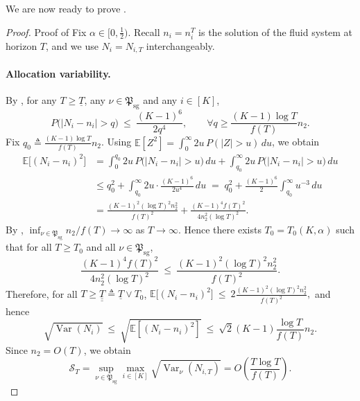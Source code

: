 \documentclass[nonblindrev]{informs3_noinforms}
\newcommand{\var}{\operatorname{Var}}
\newcommand{\E}{{\mathbb{E}}}
\begin{document}
We are now ready to prove .


\begin{proof}{Proof of }
Fix $\alpha\in[0,\tfrac12)$. Recall $n_i = n_i^T$ is the solution of the fluid system at horizon $T$, and we use $N_i = N_{i,T}$ interchangeably.
\paragraph{Allocation variability.}
By , for any $T\ge \underline T$, any $\nu \in \mathfrak{P}_{\text{sg}}$ and any $i\in[K]$,
\[
P\big(|N_i-n_i|>q\big)\ \le\ \frac{(K-1)^6}{2q^4},
\qquad \forall q\ge \frac{(K-1)\log T}{f(T)}n_2.
\]
Fix $q_0\triangleq \frac{(K-1)\log T}{f(T)}n_2$. Using
$\E[Z^2]=\int_0^\infty 2u\,P(|Z|>u)\,du$, we obtain
\begin{align*}
\E\big[(N_i-n_i)^2\big]
&= \int_0^{q_0} 2u\,P\big(|N_i-n_i|>u\big)\,du
   +\int_{q_0}^{\infty} 2u\,P\big(|N_i-n_i|>u\big)\,du \\
&\le q_0^2 + \int_{q_0}^{\infty} 2u\cdot \frac{(K-1)^6}{2u^4}\,du
 \;=\; q_0^2 + \frac{(K-1)^6}{2}\int_{q_0}^{\infty} u^{-3}\,du \\
&= \frac{(K-1)^2 (\log T)^2 n_2^2}{f(T)^2}+\frac{(K-1)^4 f(T)^2}{4n_2^2(\log T)^2}.
\end{align*}
By , $\inf_{\nu\in\mathfrak{P}_{\text{sg}}} n_2/f(T)\to\infty$ as $T\to\infty$.
Hence there exists $T_0=T_0(K,\alpha)$ such that for all $T\ge T_0$ and all $\nu\in\mathfrak{P}_{\text{sg}}$,
\[
\frac{(K-1)^4 f(T)^2}{4n_2^2(\log T)^2}\ \le\ \frac{(K-1)^2 (\log T)^2 n_2^2}{f(T)^2}.
\]
Therefore, for all $T\ge \underline{\underline T}\triangleq \underline T\vee T_0$, $\E\big[(N_i-n_i)^2\big]\ \le\ 2\frac{(K-1)^2 (\log T)^2 n_2^2}{f(T)^2},$ and hence 
\[
\sqrt{\var(N_i)}\ \le\ \sqrt{\E[(N_i-n_i)^2]}\ \le\ \sqrt{2}(K-1)\frac{\log T}{f(T)}n_2.
\]
Since $n_2=O(T)$, we obtain 
\[
\mathcal S_T
=\sup_{\nu\in\mathfrak{P}_{\text{sg}}}\max_{i\in[K]}\sqrt{\var_\nu(N_{i,T})}
= O\left(\frac{T\log T}{f(T)}\right).
\]


\end{proof}
\end{document}

